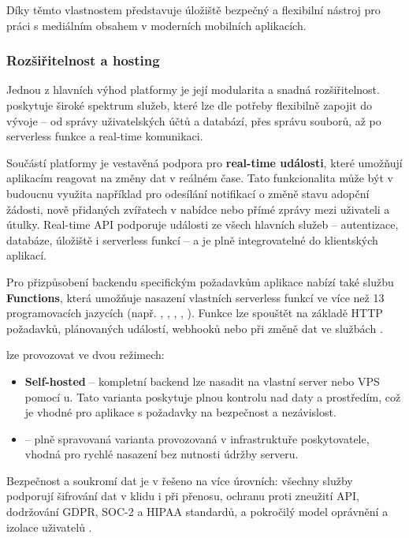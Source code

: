 \documentclass[czech, bp, kiv, he, iso690numb, pdf]{fasthesis}
\begin{document}
    Díky těmto vlastnostem představuje úložiště  bezpečný a flexibilní nástroj pro práci s mediálním obsahem v moderních mobilních aplikacích.



    \subsubsection*{Rozšiřitelnost a hosting}

    Jednou z hlavních výhod platformy  je její modularita a snadná rozšiřitelnost.  poskytuje široké spektrum služeb, které lze dle potřeby flexibilně zapojit do vývoje – od správy uživatelských účtů a databází, přes správu souborů, až po serverless funkce a real-time komunikaci.

    Součástí platformy je vestavěná podpora pro \textbf{real-time události}, které umožňují aplikacím reagovat na změny dat v reálném čase. Tato funkcionalita může být v budoucnu využita například pro odesílání notifikací o změně stavu adopční žádosti, nově přidaných zvířatech v nabídce nebo přímé zprávy mezi uživateli a útulky. Real-time API  podporuje události ze všech hlavních služeb – autentizace, databáze, úložiště i serverless funkcí – a je plně integrovatelné do klientských aplikací.

    Pro přizpůsobení backendu specifickým požadavkům aplikace  nabízí také službu \textbf{Functions}, která umožňuje nasazení vlastních serverless funkcí ve více než 13 programovacích jazycích (např. , , , , ). Funkce lze spouštět na základě HTTP požadavků, plánovaných událostí, webhooků nebo při změně dat ve službách .

     lze provozovat ve dvou režimech:
    \begin{itemize}
        \item \textbf{Self-hosted} – kompletní backend lze nasadit na vlastní server nebo VPS pomocí u. Tato varianta poskytuje plnou kontrolu nad daty a prostředím, což je vhodné pro aplikace s požadavky na bezpečnost a nezávislost.
        \item \textbf{} – plně spravovaná varianta provozovaná v infrastruktuře poskytovatele, vhodná pro rychlé nasazení bez nutnosti údržby serveru.
    \end{itemize}

    Bezpečnost a soukromí dat je v  řešeno na více úrovních: všechny služby podporují šifrování dat v klidu i při přenosu, ochranu proti zneužití API, dodržování GDPR, SOC-2 a HIPAA standardů, a pokročilý model oprávnění a izolace uživatelů \cite{appwrite}.
\end{document}
